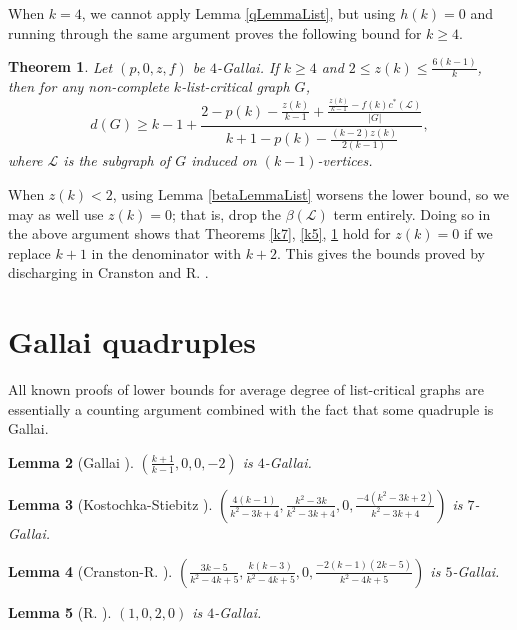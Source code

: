 \documentclass[10pt]{article}
\theoremstyle{plain}
\newtheorem{thm}{Theorem}[section]
\newtheorem{lem}[thm]{Lemma}
\theoremstyle{definition}
\theoremstyle{remark}
\newcommand{\fancy}[1]{\mathcal{#1}}
\renewcommand{\L}{\fancy{L}}
\newcommand{\card}[1]{\left|#1\right|}
\newcommand{\parens}[1]{\left( #1 \right)}
\begin{document}
\noindent When $k=4$, we cannot apply Lemma \ref{qLemmaList}, but using $h(k)=0$ and running through the same argument proves the following bound for $k\ge 4$.
\begin{thm}\label{k4}
	Let $\parens{p,0,z,f}$ be $4$-Gallai.  If $k \ge 4$ and $2 \le z(k) \le \frac{6(k-1)}{k}$, then for any non-complete $k$-list-critical graph $G$,
	\[d(G) \ge k-1 + \frac{2 - p(k) - \frac{z(k)}{k-1} + \frac{\frac{z(k)}{k-1} - f(k)c^*(\L)}{\card{G}}}{k+1 - p(k) - \frac{(k-2)z(k)}{2(k-1)}},\]
	where $\L$ is the subgraph of $G$ induced on $(k-1)$-vertices.
\end{thm}

When $z(k) < 2$, using Lemma \ref{betaLemmaList} worsens the lower bound, so we may as well use $z(k)=0$; that is, drop the $\beta(\L)$ term entirely.  
Doing so in the above argument shows that Theorems \ref{k7}, \ref{k5}, \ref{k4} hold for $z(k) = 0$ if we replace $k+1$ in the denominator with $k+2$.  
This gives the bounds proved by discharging in Cranston and R. \cite{DischargingLowerBound}.

\section{Gallai quadruples}
All known proofs of lower bounds for average degree of list-critical graphs are essentially a counting argument combined with the fact that some quadruple is Gallai.

\begin{lem}[Gallai \cite{gallai1963kritische}]
$\parens{\frac{k+1}{k-1}, 0, 0, -2}$ is $4$-Gallai.
\end{lem}

\begin{lem}[Kostochka-Stiebitz \cite{kostochkastiebitzedgesincriticalgraph}]
$\parens{\frac{4(k-1)}{k^2 - 3k + 4}, \frac{k^2 - 3k}{k^2-3k+4}, 0, \frac{-4(k^2-3k+2)}{k^2-3k+4}}$ is $7$-Gallai.
\end{lem}

\begin{lem}[Cranston-R. \cite{DischargingLowerBound}]
$\parens{\frac{3k-5}{k^2-4k+5}, \frac{k(k-3)}{k^2-4k+5}, 0, \frac{-2(k-1)(2k-5)}{k^2-4k+5}}$ is $5$-Gallai.
\end{lem}

\begin{lem}[R. \cite{Better4ListCriticalBound}]\label{Rbound}
$\parens{1, 0, 2, 0}$ is $4$-Gallai.
\end{lem}
\end{document}

